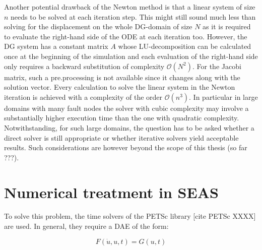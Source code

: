 \documentclass{report}
\begin{document}
Another potential drawback of the Newton method is that a linear system of size $n$ needs to be solved at each iteration step. This might still sound much less than solving for the displacement on the whole DG-domain of size $N$ as it is required to evaluate the right-hand side of the ODE at each iteration too. However, the DG system has a constant matrix $A$ whose LU-decomposition can be calculated once at the beginning of the simulation and each evaluation of the right-hand side only requires a backward substitution of complexity $\mathcal{O}\left(N^2\right)$. For the Jacobi matrix, such a pre.processing is not available since it changes along with the solution vector. Every calculation to solve the linear system in the Newton iteration is achieved with a complexity of the order $\mathcal{O}\left(n^3\right)$. In particular in large domains with many fault nodes the solver with cubic complexity may involve a substantially higher execution time than the one with quadratic complexity. Notwithstanding, for such large domains, the question has to be asked whether a direct solver is still appropriate or whether iterative solvers yield acceptable results. Such considerations are however beyond the scope of this thesis (so far ???).

\section{Numerical treatment in SEAS}
To solve this problem, the time solvers of the PETSc library [cite PETSc XXXX] are used. In general, they require a DAE of the form: 

\begin{equation}
    F(\dot{u}, u, t) = G(u, t)
\end{equation}
\end{document}

